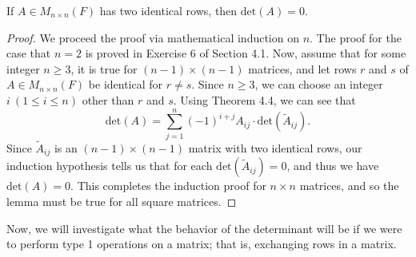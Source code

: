 \begin{corollary}\label{Corollary to Theorem 4.4}
    If \( A \in {M}_{n \times n}(F) \) has two identical rows, then \( \text{det}(A) = 0  \).
\end{corollary}
\begin{proof}
We proceed the proof via mathematical induction on \( n  \). The proof for the case that \( n = 2  \) is proved in Exercise 6 of Section 4.1. Now, assume that for some integer \( n \geq 3  \), it is true for \( (n-1) \times (n-1) \) matrices, and let rows \( r  \) and \( s  \) of \( A \in {M}_{n \times n}(F) \) be identical for \( r \neq s  \). Since \( n \geq 3  \), we can choose an integer \( i  \ (1 \leq i \leq n ) \) other than \( r  \) and \( s  \). Using Theorem 4.4, we can see that
\[  \text{det}(A) = \sum_{ j=1  }^{ n } (-1)^{i + j } {A}_{ij} \cdot \text{det}({\tilde{A}}_{ij}). \]
Since \( {\tilde{A}}_{ij} \) is an \( (n-1) \times (n-1) \) matrix with two identical rows, our induction hypothesis tells us that for each \( \text{det}({\tilde{A}}_{ij}) = 0  \), and thus we have \( \text{det}(A) = 0  \). This completes the induction proof for \( n \times n  \) matrices, and so the lemma must be true for all square matrices.
\end{proof}

Now, we will investigate what the behavior of the determinant will be if we were to perform type 1 operations on a matrix; that is, exchanging rows in a matrix. 


